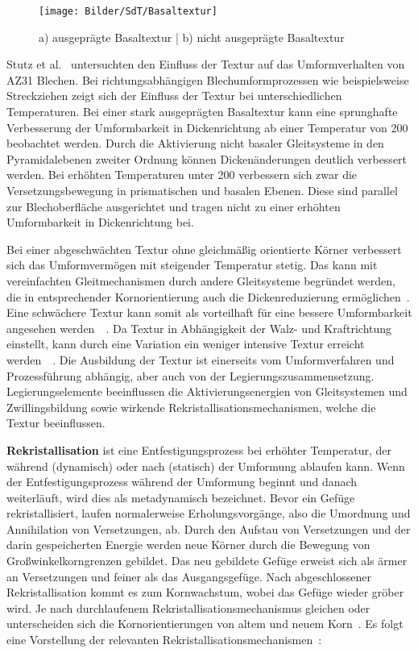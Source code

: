 \begin{figure}[H]%
    \centering
    \texttt{[image: Bilder/SdT/Basaltextur]}
    \caption[Ausgeprägte und nicht ausgeprägte Basaltextur]{a) ausgeprägte Basaltextur | b) nicht ausgeprägte Basaltextur~\cite{Ullmann2019}}
    \label{fig:basaltextur}
\end{figure}

Stutz et al.~\cite{Stutz2015} untersuchten den Einfluss der Textur auf das Umformverhalten von AZ31 Blechen.
Bei richtungsabhängigen Blechumformprozessen wie beispielsweise Streckziehen zeigt sich der Einfluss der Textur bei unterschiedlichen Temperaturen.
Bei einer stark ausgeprägten Basaltextur kann eine sprunghafte Verbesserung der Umformbarkeit in Dickenrichtung ab einer Temperatur von \SI{200}{\dC} beobachtet werden.
Durch die Aktivierung nicht basaler Gleitsysteme in den Pyramidalebenen zweiter Ordnung können Dickenänderungen deutlich verbessert werden.
Bei erhöhten Temperaturen unter \SI{200}{\dC} verbessern sich zwar die Versetzungsbewegung in prismatischen und basalen Ebenen.
Diese sind parallel zur Blechoberfläche ausgerichtet und tragen nicht zu einer erhöhten Umformbarkeit in Dickenrichtung bei.

Bei einer abgeschwächten Textur ohne gleichmäßig orientierte Körner verbessert sich das Umformvermögen mit steigender Temperatur stetig.
Das kann mit vereinfachten Gleitmechanismen durch andere Gleitsysteme begründet werden, die in entsprechender Kornorientierung auch die Dickenreduzierung ermöglichen~\cite{Stutz2015}.
Eine schwächere Textur kann somit als vorteilhaft für eine bessere Umformbarkeit angesehen werden~\cite{Bettles2005,Yukutake2003}~.
Da Textur in Abhängigkeit der Walz- und Kraftrichtung einstellt, kann durch eine Variation ein weniger intensive Textur erreicht werden~\cite{Chino2007}~.
Die Ausbildung der Textur ist einerseits vom Umformverfahren und Prozessführung abhängig, aber auch von der Legierungszusammensetzung.
Legierungselemente beeinflussen die Aktivierungsenergien von Gleitsystemen und Zwillingsbildung sowie wirkende Rekristallisationsmechanismen, welche die Textur beeinflussen.


\textbf{Rekristallisation} ist eine Entfestigungsprozess bei erhöhter Temperatur, der während (dynamisch) oder nach (statisch) der Umformung ablaufen kann.
Wenn der Entfestigungsprozess während der Umformung beginnt und danach weiterläuft, wird dies als metadynamisch bezeichnet.
Bevor ein Gefüge rekristallisiert, laufen normalerweise Erholungsvorgänge, also die Umordnung und Annihilation von Versetzungen, ab.
Durch den Aufstau von Versetzungen und der darin gespeicherten Energie werden neue Körner durch die Bewegung von Großwinkelkorngrenzen gebildet.
Das neu gebildete Gefüge erweist sich als ärmer an Versetzungen und feiner als das Ausgangsgefüge.
Nach abgeschlossener Rekristallisation kommt es zum Kornwachstum, wobei das Gefüge wieder gröber wird.
Je nach durchlaufenem Rekristallisationsmechanismus gleichen oder unterscheiden sich die Kornorientierungen von altem und neuem Korn~\cite{Ullmann2014}.
Es folgt eine Vorstellung der relevanten Rekristallisationsmechanismen~\cite{Kittner.2019}:

